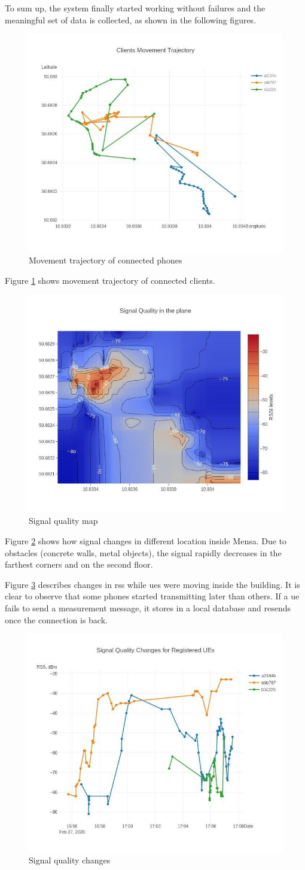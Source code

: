 To sum up, the system finally started working without failures and the meaningful set of data is collected, as shown in the following figures.



\begin{figure}[H]
	\centering
	\includegraphics[width=0.5\linewidth,keepaspectratio]{images/experiment_3_1.jpg}
	\caption{Movement trajectory of connected phones}
	\label{fig:movement-trajectory}
\end{figure}

Figure \ref{fig:movement-trajectory} shows movement trajectory of connected clients. 

\begin{figure}[H]
	\centering
	\includegraphics[width=0.5\linewidth,keepaspectratio]{images/experiment_3_2.jpg}
	\caption{Signal quality map}
	\label{fig:signal-quality-heatmap}
\end{figure}

Figure \ref{fig:signal-quality-heatmap} shows how signal changes in different location inside Mensa. Due to obstacles (concrete walls, metal objects), the signal rapidly decreases in the farthest corners and on the second floor.

Figure \ref{fig:signal-quality-changes} describes changes in \acrshort{rss} while \glspl{ue} were moving inside the building. It is clear to observe that some phones started transmitting later than others. If a \gls{ue} fails to send a measurement message, it stores in a local database and resends once the connection is back.


\begin{figure}[H]
	\centering
	\includegraphics[width=0.5\linewidth,keepaspectratio]{images/experiment_3_3.jpg}
	\caption{Signal quality changes}
	\label{fig:signal-quality-changes}
\end{figure}
